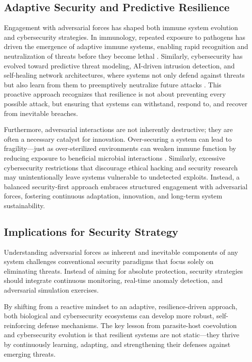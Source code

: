 \documentclass{article}
\begin{document}
\subsection{Adaptive Security and Predictive Resilience}
Engagement with adversarial forces has shaped both immune system evolution and cybersecurity strategies. In immunology, repeated exposure to pathogens has driven the emergence of adaptive immune systems, enabling rapid recognition and neutralization of threats before they become lethal \citep{murphy2012janeway}. Similarly, cybersecurity has evolved toward predictive threat modeling, AI-driven intrusion detection, and self-healing network architectures, where systems not only defend against threats but also learn from them to preemptively neutralize future attacks \citep{biggio2018wild}. This proactive approach recognizes that resilience is not about preventing every possible attack, but ensuring that systems can withstand, respond to, and recover from inevitable breaches.

Furthermore, adversarial interactions are not inherently destructive; they are often a necessary catalyst for innovation. Over-securing a system can lead to fragility—just as over-sterilized environments can weaken immune function by reducing exposure to beneficial microbial interactions \citep{dobson1989population}. Similarly, excessive cybersecurity restrictions that discourage ethical hacking and security research may unintentionally leave systems vulnerable to undetected exploits. Instead, a balanced security-first approach embraces structured engagement with adversarial forces, fostering continuous adaptation, innovation, and long-term system sustainability.

\subsection{Implications for Security Strategy}
Understanding adversarial forces as inherent and inevitable components of any system challenges conventional security paradigms that focus solely on eliminating threats. Instead of aiming for absolute protection, security strategies should integrate continuous monitoring, real-time anomaly detection, and adversarial simulation exercises. 

By shifting from a reactive mindset to an adaptive, resilience-driven approach, both biological and cybersecurity ecosystems can develop more robust, self-reinforcing defense mechanisms. The key lesson from parasite-host coevolution and cybersecurity evolution is that resilient systems are not static—they thrive by continuously learning, adapting, and strengthening their defenses against emerging threats.
\end{document}
